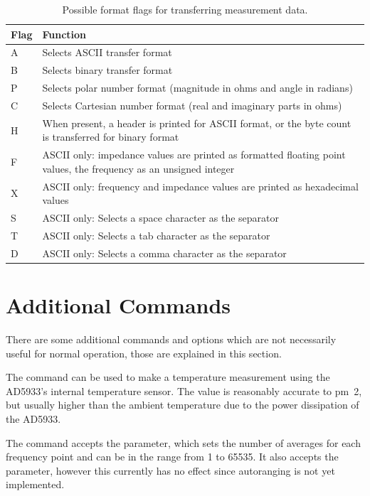 \begin{table}[htpb]
  \caption{Possible format flags for transferring measurement data.}
  \centering
  \begin{tabular}{>{\ttfamily\bgroup}l<{\egroup} !{\color{MidnightBlue}\vline} p{10cm}}
    Flag  & Function \\ \hline \hline
    A     & Selects ASCII transfer format \\
    B     & Selects binary transfer format \\ \hline
    P     & Selects polar number format (magnitude in ohms and angle in radians) \\
    C     & Selects Cartesian number format (real and imaginary parts in ohms) \\ \hline
    H     & When present, a header is printed for ASCII format, or the byte count is transferred for binary format \\ \hline
    F     & ASCII only: impedance values are printed as formatted floating point values, the frequency as an unsigned integer \\
    X     & ASCII only: frequency and impedance values are printed as hexadecimal values \\ \hline
    S     & ASCII only: Selects a space character as the separator \\
    T     & ASCII only: Selects a tab character as the separator \\
    D     & ASCII only: Selects a comma character as the separator
  \end{tabular}
  \label{tab:format_flags}
\end{table}


\section{Additional Commands}

There are some additional commands and options which are not necessarily useful for normal operation, those are
explained in this section.

The  command can be used to make a temperature measurement using the AD5933's internal temperature
sensor. The value is reasonably accurate to \unit{\pm 2}{\celsius}, but usually higher than the ambient temperature due
to the power dissipation of the AD5933.

The  command accepts the  parameter, which sets the number of averages for each
frequency point and can be in the range from 1 to 65535.
It also accepts the  parameter, however this currently has no effect since autoranging is
not yet implemented.

